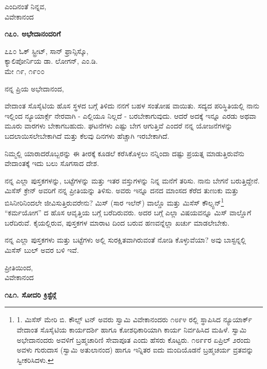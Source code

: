\begin{flushright}
ಎಂದಿನಂತೆ ನಿನ್ನವ,\\ವಿವೇಕಾನಂದ
\end{flushright}

\begin{center}
\textbf{೧೭೦. ಅಭೇದಾನಂದರಿಗೆ}
\end{center}

\begin{flushright}
೭೭೦ ಓಕ್ ಸ್ಟ್ರೀಟ್, ಸಾನ್ ಫ್ರಾನ್ಸಿಸ್ಕೊ,\\ಕ್ಯಾಲಿಪೋರ್ನಿಯ  ಡಾ. ಲೋಗನ್, ಎಂ.ಡಿ.\\ಮೇ ೧೯, ೧೯೦೦
\end{flushright}

ನನ್ನ ಪ್ರಿಯ ಅಭೇದಾನಂದ,

ವೇದಾಂತ ಸೊಸೈಟಿಯ ಹೊಸ ಸ್ಥಳದ ಬಗ್ಗೆ ತಿಳಿದು ನನಗೆ ಬಹಳ ಸಂತೋಷ ವಾಯಿತು. ಸದ್ಯದ ಪರಿಸ್ಥಿತಿಯಲ್ಲಿ ನಾನು ಇಲ್ಲಿಂದ ನ್ಯೂಯಾರ್ಕ್ಗೆ ನೇರವಾಗಿ - ಎಲ್ಲಿಯೂ ನಿಲ್ಲದೆ - ಬರಬೇಕಾಗುವುದು. ಆದರೆ ಅದಕ್ಕೆ ಇನ್ನೂ ಎರಡು ಅಥವಾ ಮೂರು ವಾರಗಳು ಬೇಕಾಗಬಹುದು. ಘಟನೆಗಳು ಎಷ್ಟು ಬೇಗ ಆಗುತ್ತಿವೆ ಎಂದರೆ ನನ್ನ ಯೋಜನೆಗಳನ್ನು ಬದಲಾಯಿಸಲೇಬೇಕಾಗಿದೆ ಮತ್ತು ಕೆಲವು ದಿನಗಳು ಹೆಚ್ಚಾಗಿ ಇರಬೇಕಾಗಿದೆ.

ನಿಮ್ಮಲ್ಲಿ ಯಾರಾದರೊಬ್ಬರನ್ನು ಈ ತೀರಕ್ಕೆ ಕೂಡಲೆ ಕರೆಸಿಕೊಳ್ಳಲು ನನ್ನಿಂದಾ ದಷ್ಟು ಪ್ರಯತ್ನ ಮಾಡುತ್ತಿರುವೆನು ವೇದಾಂತಕ್ಕೆ ಇದು ಬಲು ಸೊಗಸಾದ ದೇಶ.

ನನ್ನ ಎಲ್ಲಾ ಪುಸ್ತಕಗಳನ್ನು, ಬಟ್ಟೆಗಳನ್ನು ಮತ್ತು ಇತರ ವಸ್ತುಗಳನ್ನು ನಿನ್ನ ಮನೆಗೆ ತರಿಸು. ನಾನು ಬೇಗನೆ ಬರುತ್ತಿದ್ದೇನೆ. ಮಿಸೆಸ್ ಕ್ರೇನ್ ಅವರಿಗೆ ನನ್ನ ಪ್ರೀತಿಯನ್ನು ತಿಳಿಸು. ಅವರು ಇನ್ನೂ ದನದ ಮಾಂಸದ ಕೆರೆದ ತುಣುಕು ಮತ್ತು ಬಿಸಿನೀರಿನಿಂದಲೇ ಜೀವಿಸುತ್ತಿರುವರೇನು? ಮಿಸ್ (ಸಾರ ಇಲೆನ್) ವಾಲ್ಡೊ ಮತ್ತು ಮಿಸೆಸ್ ಕೌಲ್ಸ್ಟನ್\footnote{1. ಮಿಸೆಸ್ ಮೇರಿ ಬಿ. ಕೌಲ್ಸ್ ಟನ್ ಅವರು ಸ್ವಾಮಿ ವಿವೇಕಾನಂದರು ೧೮೯೪ ರಲ್ಲಿ ಸ್ಥಾಪಿಸಿದ ನ್ಯೂಯಾರ್ಕ್ ವೇದಾಂತ ಸೊಸೈಟಿಯ ಕಾರ್ಯದರ್ಶಿ ಹಾಗೂ ಕೋಶಧಿಕಾರಿಯಾಗಿ ಕಾರ್ಯ ನಿರ್ವಹಿಸಿದ ಮಹಿಳೆ. ಸ್ವಾಮಿ ಅಭೇದಾನಂದರು ಅವಳಿಗೆ ಬ್ರಹ್ಮಚಾರಿಣಿ ಸೇವಾಪೂತ ಎಂದು ಹೆಸರು ಕೊಟ್ಟರು. ೧೮೯೯ರ ಏಪ್ರಿಲ್ ೨ರಂದು ಅವಳು ಗುರುದಾಸ (ಸ್ವಾಮಿ ಅತುಲಾನಂದ) ಹಾಗೂ ಇನ್ನಿತರ ಐದು ಮಂದಿಯೊಡನೆ ಬ್ರಹ್ಮಚರ್ಯ ವ್ರತವನ್ನು ಸ್ವೀಕರಿಸಿದಳು.} “ಕರ್ಮಯೋಗ” ದ ಹೊಸ ಆವೃತ್ತಿಯ ಬಗ್ಗೆ ಬರೆದಿರುವರು. ಅದರ ಬಗ್ಗೆ ಎಲ್ಲಾ ವಿಷಯವನ್ನೂ ಮಿಸ್ ವಾಲ್ಡೊಗೆ ಬರೆದಿರುವೆ. ಕೈಯಲ್ಲಿರುವ, ಪುಸ್ತಕಗಳ ಮಾರಾಟ ದಿಂದ ಬರುವ ಹಣವನ್ನೆಲ್ಲಾ ಖರ್ಚು ಮಾಡಲೇಬೇಕು.

ನನ್ನ ಎಲ್ಲಾ ಪುಸ್ತಕಗಳು ಮತ್ತು ಬಟ್ಟೆಗಳು ಅಲ್ಲಿ ಸುರಕ್ಷಿತವಾಗಿರುವಂತೆ ನೋಡಿ ಕೊಳ್ಳುವೆಯಾ? ಅವು ಬಾಸ್ಟನ್ನಲ್ಲಿ ಮಿಸೆಸ್ ಬುಲ್ ಅವರ ಬಳಿ ಇವೆ.

\begin{flushright}
ಪ್ರೀತಿಯಿಂದ,\\ವಿವೇಕಾನಂದ
\end{flushright}

\begin{center}
\textbf{೧೭೧. ಸೋದರಿ ಕ್ರಿಸ್ಟೆನ್ಗೆ}
\end{center}

